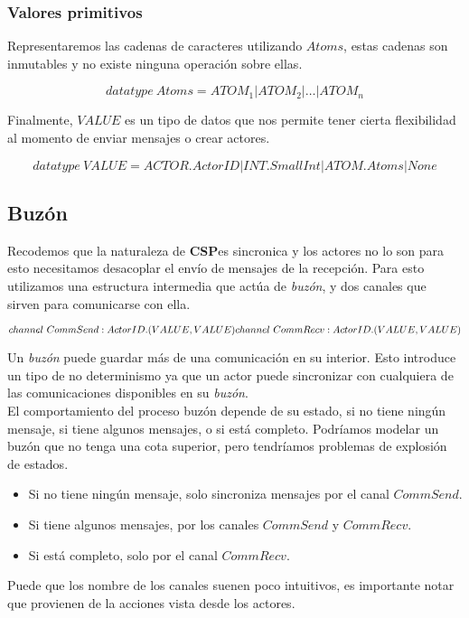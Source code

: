 \documentclass[fleqn]{article}
\newcommand{\CSP}{\textbf{CSP}}
\begin{document}
\subsubsection{Valores primitivos}

Representaremos las cadenas de caracteres utilizando $Atoms$, estas cadenas son inmutables y no existe ninguna operación sobre ellas.

\[
  datatype\ Atoms = ATOM_1 | ATOM_2 | \ldots | ATOM_n
\]

Finalmente, $VALUE$ es un tipo de datos que nos permite tener cierta flexibilidad al momento de enviar mensajes o crear actores.

\[
  datatype\ VALUE = ACTOR.ActorID | INT.SmallInt | ATOM.Atoms | None
\]

\subsection{Buzón}

Recodemos que la naturaleza de \CSP es sincronica y los actores no lo son para esto necesitamos desacoplar el envío de mensajes de la recepción. Para esto utilizamos una estructura intermedia que actúa de \textit{buzón}, y dos canales que sirven para comunicarse con ella.

\[
channel\ CommSend:ActorID.(VALUE, VALUE)\\
channel\ CommRecv:ActorID.(VALUE, VALUE)
\]

Un \textit{buzón} puede guardar más de una comunicación en su interior. Esto introduce un tipo de no determinismo ya que un actor puede sincronizar con cualquiera de las comunicaciones disponibles en su \textit{buzón}.\\
El comportamiento del proceso buzón depende de su estado, si no tiene ningún mensaje, si tiene algunos mensajes, o si está completo. Podríamos modelar un buzón que no tenga una cota superior, pero tendríamos problemas de explosión de estados.

\begin{itemize}
\item Si no tiene ningún mensaje, solo sincroniza mensajes por el canal $CommSend$.
\item Si tiene algunos mensajes, por los canales $CommSend$ y $CommRecv$.
\item Si está completo, solo por el canal $CommRecv$.
\end{itemize}

Puede que los nombre de los canales suenen poco intuitivos, es importante notar que provienen de la acciones vista desde los actores.
\end{document}

